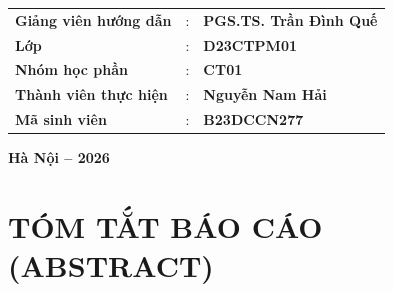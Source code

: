 \documentclass[12pt,a4paper]{article}
\begin{document}
\begin{titlepage}
    \vspace{0.8cm}

    \begin{flushleft}
        \hspace{1.6cm}
        \begin{tabular}{p{5.0cm} p{0.5cm} l}
            \textbf{Giảng viên hướng dẫn} & : & \textbf{PGS.TS. Trần Đình Quế} \\[0.3cm]
            \textbf{Lớp}                  & : & \textbf{D23CTPM01} \\[0.3cm]
            \textbf{Nhóm học phần}        & : & \textbf{CT01} \\[0.3cm]
            \textbf{Thành viên thực hiện} & : & \textbf{Nguyễn Nam Hải} \\[0.3cm]
            \textbf{Mã sinh viên}         & : & \textbf{B23DCCN277} \\[0.3cm]
        \end{tabular}
    \end{flushleft}

    \vfill
    {\large \textbf{Hà Nội -- 2026}}
    \vspace*{0.3cm}
\end{titlepage}

\newpage
\renewcommand{\contentsname}{MỤC LỤC BÁO CÁO KỸ THUẬT ASSIGNMENT 05}
\tableofcontents
\newpage

{}
\listoffigures

\vspace{0.8cm}

{}
\listoftables

\newpage

{}
\section*{TÓM TẮT BÁO CÁO (ABSTRACT)}
\end{document}
